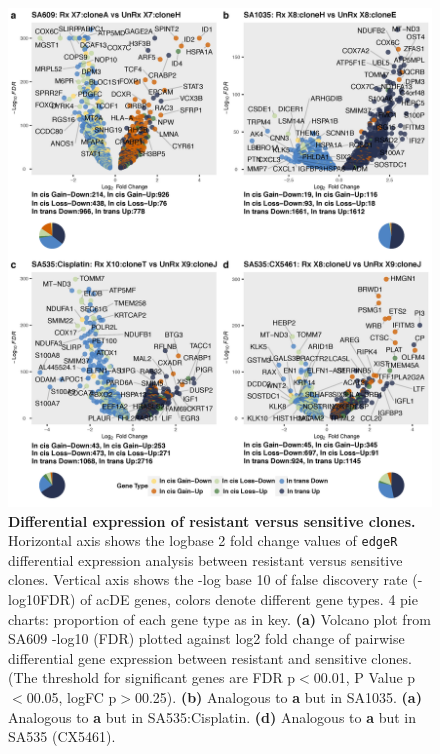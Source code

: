   


\begin{figure}
\centering
  \includegraphics[width=\textwidth]{Figures/chap5/Volcanoes4plots.png}
\caption[DE of resistant and sensitive \texttt{clonealign} defined clones]
	{\small
	\textbf{Differential expression of resistant versus sensitive clones.}
	Horizontal axis shows the logbase 2 fold change values of \texttt{edgeR} differential expression analysis between resistant versus sensitive clones. Vertical axis shows the -log base 10 of false discovery rate (-log10FDR) of ac{DE} genes, colors denote different gene types. 4 pie charts:  proportion of each gene type as in key.
	\textbf{(a)} Volcano plot from SA609 -log10 (FDR) plotted against log2 fold change of pairwise differential gene expression between resistant and sensitive clones. (The threshold for significant genes are FDR p$<$00.01, P Value p$<$00.05, logFC p$>$00.25). \textbf{(b)} Analogous to \textbf{a} but in SA1035. \textbf{(a)} Analogous to \textbf{a} but in SA535:Cisplatin. \textbf{(d)} Analogous to \textbf{a} but in SA535 (CX5461).
	   }
	\label{fig:Volcanoes4plots}
 \end{figure}

